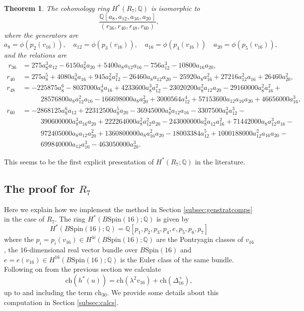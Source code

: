 \documentclass[twoside,a4paper,reqno,11pt]{amsart}
\newtheorem{theorem}[lemma]{Theorem}
\newcommand{\Q}{\mathbb{Q}}
\newcommand{\Spin}{\mathrm{Spin}}
\newcommand{\ch}{\mathrm{ch}}
\begin{document}
\begin{theorem} \label{thm:presR7}
The cohomology ring $H^*(R_7; \Q)$ is isomorphic to \[ \frac{\Q[a_{8}, a_{12}, a_{16}, a_{20}]}{(r_{36},r_{40}, r_{48},r_{60})}, \] 
where the generators are \[a_8 = \phi(p_2(v_{16})), \quad a_{12} = \phi(p_3(v_{16})), \quad a_{16} = \phi(p_4(v_{16})) \quad a_{20} = \phi(p_5(v_{16})),\] and the relations are 
\begin{align*}
\ r_{36} & = 275 a_8^3 a_{12} - 6150 a_8^2a_{20} + 5400 a_8 a_{12} a_{16} - 756 a_{12}^3 - 10800 a_{16}a_{20}, \\
r_{40} & = 275 a_{8}^5 + 4080 a_{8}^3 a_{16} + 945 a_{8}^2 a_{12}^2 - 26460 a_8 a_{12} a_{20} - 25920 a_8 a_{16}^2 + 27216 a_{12}^2 a_{16} + 26460 a_{20}^2, \\
r_{48} & = -225875 a_8^6 - 8037000 a_{8}^4 a_{16} + 4233600 a_8^3 a_{12}^2 - 23020200 a_{8}^2 a_{12} a_{20} - 29160000 a_{8}^2 a_{16}^2 + {} \\ 
 & \phantom{==} 28576800 a_{8} a_{12}^2a_{16} - 166698000 a_{8} a_{20}^2 + 3000564 a_{12}^4 + 57153600 a_{12} a_{16} a_{20} + 46656000 a_{16}^3, \\
r_{60}  & = -2868125 a_8^6a_{12} + 22312500 a_{8}^5 a_{20} - 36945000 a_{8}^4 a_{12} a_{16} - 3307500 a_{8}^3 a_{12}^3 - {} \\
& \phantom{==} 390600000 a_8^3 a_{16} a_{20} + 222264000 a_8^2 a_{12}^2 a_{20} - 243000000 a_{8}^2 a_{12} a_{16}^2 + 71442000 a_{8} a_{12}^3 a_{16} - {} \\
& \phantom{==} 972405000 a_{8} a_{12} a_{20}^2 + 1360800000 a_{8}a_{16}^2 a_{20} - 18003384 a_{12}^5 + 1000188000 a_{12}^2 a_{16} a_{20} - {} \\
& \phantom{==} 699840000 a_{12} a_{16}^3 - 463050000 a_{20}^3.
\end{align*}
\end{theorem}

This seems to be the first explicit presentation of $H^*(R_7; \Q)$ in the literature.

\subsection{The proof for $R_7$}
Here we explain how we implement the method in Section \ref{subsec:genstratcomps} in the case of $R_7$. The ring $H^*(B\Spin(16); \Q)$ is given by 
$$
H^*(B\Spin(16); \Q) = \Q[p_1, p_2, p_3, p_4, e, p_5, p_6, p_7]
$$
where the $p_i=p_i(v_{16}) \in H^{4i}(B\Spin(16); \Q)$ are the Pontryagin classes of $v_{16}$, the $16$-dimensional real vector bundle over $B\Spin(16)$ and $e=e(v_{16}) \in H^{16}(B\Spin(16); \Q)$ is the Euler class of the same bundle. Following on from the previous section we calculate
\[
\ch(h^*(u)) = \ch(\lambda^2 v_{16}) + \ch(\Delta_{16}^+),
\]
up to and including the term $\ch_{30}$. We provide some details about this computation in Section \ref{subsec:calcs}. 
\end{document}
